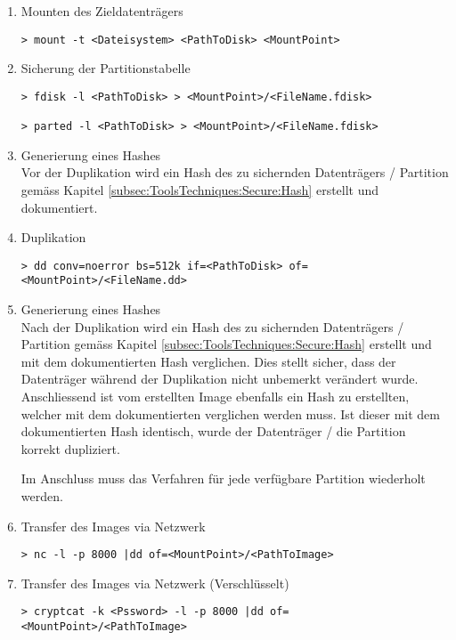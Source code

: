 \begin{enumerate}
\item Mounten des Zieldatenträgers
\begin{lstlisting}
> mount -t <Dateisystem> <PathToDisk> <MountPoint>
\end{lstlisting}

\item Sicherung der Partitionstabelle
\begin{lstlisting}
> fdisk -l <PathToDisk> > <MountPoint>/<FileName.fdisk>

> parted -l <PathToDisk> > <MountPoint>/<FileName.fdisk>
\end{lstlisting}

\item Generierung eines Hashes\\
Vor der Duplikation wird ein Hash des zu sichernden Datenträgers / Partition gemäss Kapitel \ref{subsec:ToolsTechniques:Secure:Hash}  erstellt und dokumentiert.

\item Duplikation
\begin{lstlisting}
> dd conv=noerror bs=512k if=<PathToDisk> of=<MountPoint>/<FileName.dd>
\end{lstlisting}

\item Generierung eines Hashes\\
Nach der Duplikation wird ein Hash des zu sichernden Datenträgers / Partition gemäss Kapitel \ref{subsec:ToolsTechniques:Secure:Hash}  erstellt und mit dem dokumentierten Hash verglichen. Dies stellt sicher, dass der Datenträger während der Duplikation nicht unbemerkt verändert wurde. Anschliessend ist vom erstellten Image ebenfalls ein Hash zu erstellten, welcher mit dem dokumentierten verglichen werden muss. Ist dieser mit dem dokumentierten Hash identisch, wurde der Datenträger / die Partition korrekt dupliziert.

Im Anschluss muss das Verfahren für jede verfügbare Partition wiederholt werden.

\item Transfer des Images via Netzwerk
\begin{lstlisting}
> nc -l -p 8000 |dd of=<MountPoint>/<PathToImage>
\end{lstlisting}

\item Transfer des Images via Netzwerk (Verschlüsselt)
\begin{lstlisting}
> cryptcat -k <Pssword> -l -p 8000 |dd of=<MountPoint>/<PathToImage>
\end{lstlisting}

\end{enumerate}


